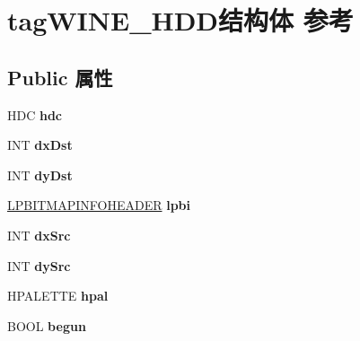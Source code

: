 \hypertarget{structtag_w_i_n_e___h_d_d}{}\section{tag\+W\+I\+N\+E\+\_\+\+H\+D\+D结构体 参考}
\label{structtag_w_i_n_e___h_d_d}
\subsection*{Public 属性}
\begin{DoxyCompactItemize}
\item 
\mbox{\label{structtag_w_i_n_e___h_d_d_a6202b4e62e702fb7e8e6cd93d5bd64c9}} 
H\+DC {\bfseries hdc}
\item 
\mbox{\label{structtag_w_i_n_e___h_d_d_af4d620073403b15a6c363e1e38c48913}} 
I\+NT {\bfseries dx\+Dst}
\item 
\mbox{\label{structtag_w_i_n_e___h_d_d_a95998f308dd48623138439edcd8ba94e}} 
I\+NT {\bfseries dy\+Dst}
\item 
\mbox{\label{structtag_w_i_n_e___h_d_d_afb15cc488a13a8435c404ca05dbc8de6}} 
\hyperlink{struct_b_i_t_m_a_p_i_n_f_o_h_e_a_d_e_r}{L\+P\+B\+I\+T\+M\+A\+P\+I\+N\+F\+O\+H\+E\+A\+D\+ER} {\bfseries lpbi}
\item 
\mbox{\label{structtag_w_i_n_e___h_d_d_ac7e0cebd114ca3a43dca8abfac53f7d1}} 
I\+NT {\bfseries dx\+Src}
\item 
\mbox{\label{structtag_w_i_n_e___h_d_d_a966315db7fba05f675ec1f90b5374267}} 
I\+NT {\bfseries dy\+Src}
\item 
\mbox{\label{structtag_w_i_n_e___h_d_d_ad2b09a42ec1019b0e98c98ebe7bc67b8}} 
H\+P\+A\+L\+E\+T\+TE {\bfseries hpal}
\item 
\mbox{\label{structtag_w_i_n_e___h_d_d_a51b9b25cfcd38383fea768f05d2e3753}} 
B\+O\+OL {\bfseries begun}
\item 
\mbox{\label{structtag_w_i_n_e___h_d_d_a43de4a82ba3cc1e68de97fb049986854}} 

\end{DoxyCompactItemize}
